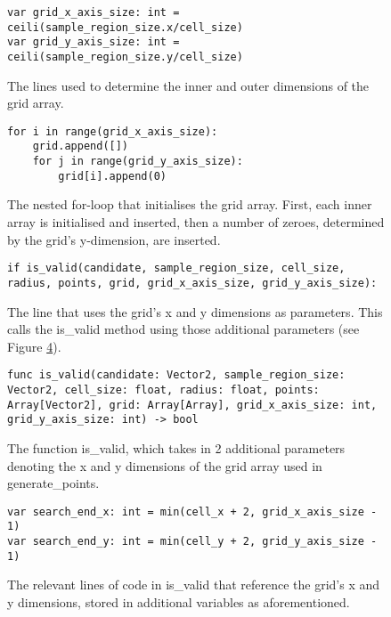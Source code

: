 \begin{figure}[H]
    \centering
    \begin{lstlisting}
var grid_x_axis_size: int = ceili(sample_region_size.x/cell_size)
var grid_y_axis_size: int = ceili(sample_region_size.y/cell_size)
    \end{lstlisting}
    \caption{The lines used to determine the inner and outer dimensions of the grid array.}
    \label{fig:pds1}
\end{figure}

\begin{figure}[H]
    \centering
    \begin{lstlisting}
for i in range(grid_x_axis_size):
	grid.append([])
	for j in range(grid_y_axis_size):
		grid[i].append(0)
    \end{lstlisting}
    \caption{The nested for-loop that initialises the grid array. First, each inner array is initialised and inserted, then a number of zeroes, determined by the grid's y-dimension, are inserted.}
    \label{fig:pds2}
\end{figure}

\begin{figure}[H]
    \centering
    \begin{lstlisting}
if is_valid(candidate, sample_region_size, cell_size, radius, points, grid, grid_x_axis_size, grid_y_axis_size):
    \end{lstlisting}
    \caption{The line that uses the grid's x and y dimensions as parameters. This calls the is\_valid method using those additional parameters (see Figure \ref{fig:pds4}).}
    \label{fig:pds3}
\end{figure}

\begin{figure}[H]
    \centering
    \begin{lstlisting}
func is_valid(candidate: Vector2, sample_region_size: Vector2, cell_size: float, radius: float, points: Array[Vector2], grid: Array[Array], grid_x_axis_size: int, grid_y_axis_size: int) -> bool
    \end{lstlisting}
    \caption{The function is\_valid, which takes in 2 additional parameters denoting the x and y dimensions of the grid array used in generate\_points.}
    \label{fig:pds4}
\end{figure}

\begin{figure}[H]
    \centering
    \begin{lstlisting}
var search_end_x: int = min(cell_x + 2, grid_x_axis_size - 1)
var search_end_y: int = min(cell_y + 2, grid_y_axis_size - 1)
    \end{lstlisting}
    \caption{The relevant lines of code in is\_valid that reference the grid's x and y dimensions, stored in additional variables as aforementioned.}
    \label{fig:pds5}
\end{figure}

